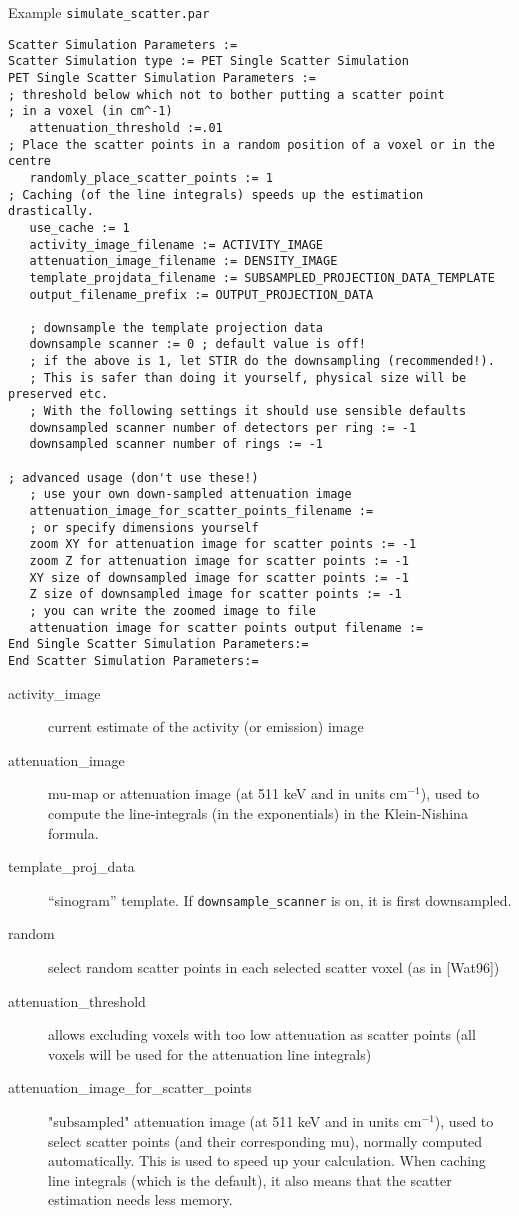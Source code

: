\documentclass{article}
\begin{document}
Example \texttt{simulate\_scatter.par}
\begin{verbatim}
Scatter Simulation Parameters :=
Scatter Simulation type := PET Single Scatter Simulation
PET Single Scatter Simulation Parameters :=
; threshold below which not to bother putting a scatter point
; in a voxel (in cm^-1)
   attenuation_threshold :=.01
; Place the scatter points in a random position of a voxel or in the centre
   randomly_place_scatter_points := 1
; Caching (of the line integrals) speeds up the estimation drastically.
   use_cache := 1
   activity_image_filename := ACTIVITY_IMAGE
   attenuation_image_filename := DENSITY_IMAGE
   template_projdata_filename := SUBSAMPLED_PROJECTION_DATA_TEMPLATE
   output_filename_prefix := OUTPUT_PROJECTION_DATA

   ; downsample the template projection data
   downsample scanner := 0 ; default value is off!
   ; if the above is 1, let STIR do the downsampling (recommended!).
   ; This is safer than doing it yourself, physical size will be preserved etc.
   ; With the following settings it should use sensible defaults
   downsampled scanner number of detectors per ring := -1
   downsampled scanner number of rings := -1

; advanced usage (don't use these!)
   ; use your own down-sampled attenuation image
   attenuation_image_for_scatter_points_filename :=
   ; or specify dimensions yourself
   zoom XY for attenuation image for scatter points := -1
   zoom Z for attenuation image for scatter points := -1
   XY size of downsampled image for scatter points := -1
   Z size of downsampled image for scatter points := -1
   ; you can write the zoomed image to file
   attenuation image for scatter points output filename :=
End Single Scatter Simulation Parameters:=
End Scatter Simulation Parameters:=
\end{verbatim}
\begin{description}
\item[activity\_image]
current estimate of the activity (or emission) image
\item[attenuation\_image] mu-map or attenuation image (at 511 keV and in units cm$^{-1}$),
used to compute the line-integrals (in the exponentials) in the Klein-Nishina formula.
\item[template\_proj\_data]
``sinogram'' template. If \texttt{downsample\_scanner} is on, it
is first downsampled.
\item[random]
select random scatter points in each selected scatter voxel (as in [Wat96])
\item[attenuation\_threshold]
allows excluding voxels with too low attenuation as scatter points (all voxels will be used for the attenuation line integrals)
\item[attenuation\_image\_for\_scatter\_points] "subsampled" attenuation image (at 511 keV and in units cm${}^{-1}$), 
used to select scatter points (and their corresponding mu),
normally computed automatically. This is used to speed up your
 calculation. When caching line integrals (which is the default), it also means that the scatter estimation
 needs less memory.
\end{description}
\end{document}
